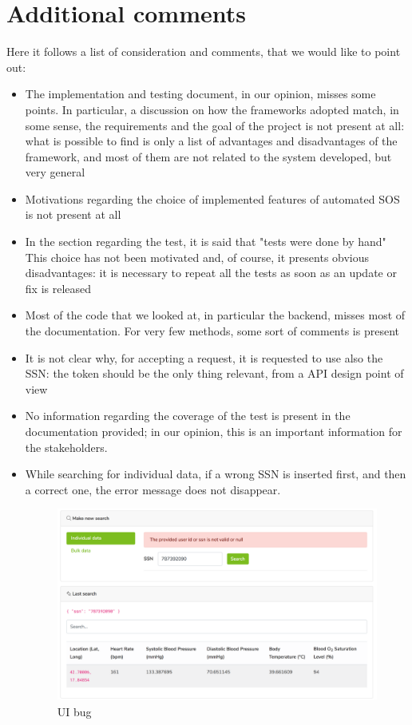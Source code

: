 \section{Additional comments}
Here it follows a list of consideration and comments, that we would like to point out:
\begin{itemize}
\item The implementation and testing document, in our opinion, misses some points. 
In particular, a discussion on how the frameworks adopted match, in some sense, the requirements and the goal of the project 
is not present at all: what is possible to find is only a list of advantages and disadvantages of the framework, and most of them are not
related to the system developed, but very general
\item Motivations regarding the choice of implemented features of automated SOS is not present at all
\item In the section regarding the test, it is said that "tests were done by hand"
This choice has not been motivated and, of course, it presents obvious disadvantages: it is necessary to repeat all the tests as soon as
an update or fix is released
\item Most of the code that we looked at, in particular the backend, misses most of the documentation. For very few methods, some sort
of comments is present
\item It is not clear why, for accepting a request, it is requested to use also the SSN: the token should be the only thing relevant, from a
API design point of view
\item No information regarding the coverage of the test is present in the documentation provided; in our opinion, this is an important information for the stakeholders.

\item While searching for individual data, if a wrong SSN is inserted first, and then 
a correct one, the error message does not disappear. 

\begin{figure}[H]
\includegraphics[width=\linewidth]{images/individualCorrectSsn2}
\caption{ UI bug }
\label{fig:bug1}
\end{figure}


\end{itemize}
